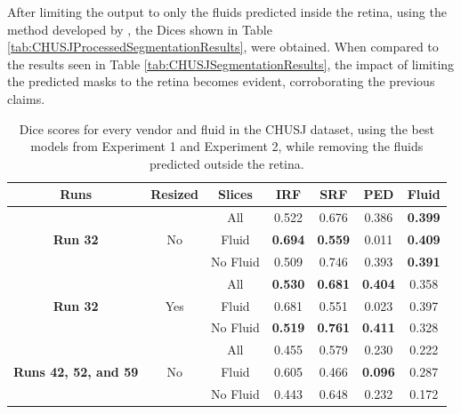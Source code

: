 After limiting the output to only the fluids predicted inside the retina, using the method developed by \textcite{Melo2023}, the Dices shown in Table \ref{tab:CHUSJProcessedSegmentationResults}, were obtained. When compared to the results seen in Table \ref{tab:CHUSJSegmentationResults}, the impact of limiting the predicted masks to the retina becomes evident, corroborating the previous claims.

\begin{table}[!ht]
	\caption{Dice scores for every vendor and fluid in the CHUSJ dataset, using the best models from Experiment 1 and Experiment 2, while removing the fluids predicted outside the retina.}
	\centering
	\begin{tabular}{|c|c|c|c|c|c|c|}
		\hline
		\textbf{Runs} &
		\textbf{Resized} &
		\textbf{Slices} &  
		\textbf{IRF} & 
		\textbf{SRF} & 
		\textbf{PED} & 
		\textbf{Fluid} \\
		
		\hline
		
		\multirow{3}{*}{\textbf{Run 32}} & \multirow{3}{*}{No} & All & 0.522 & 0.676 & 0.386 & \textbf{0.399} \\
		
		& & Fluid & \textbf{0.694} & \textbf{0.559} & 0.011 & \textbf{0.409} \\	
		
		& & No Fluid & 0.509 & 0.746 & 0.393 & \textbf{0.391}\\
		
		\hline
		
		\multirow{3}{*}{\textbf{Run 32}} & \multirow{3}{*}{Yes} & 
		All & \textbf{0.530} & \textbf{0.681} & \textbf{0.404} & 0.358 \\
		
		& & Fluid & 0.681 & 0.551 & 0.023 & 0.397 \\
		
		& & No Fluid & \textbf{0.519} & \textbf{0.761} & \textbf{0.411} & 0.328\\
		
		\hline
		\hline
		
		\multirow{3}{*}{\parbox{2cm}{\textbf{Runs 42, 52, and 59}}} & \multirow{3}{*}{No} & All & 0.455 & 0.579 & 0.230 & 0.222 \\
		
		& & Fluid & 0.605 & 0.466 & \textbf{0.096} & 0.287 \\
		
		& & No Fluid & 0.443 & 0.648 & 0.232 & 0.172\\
		

\end{tabular}
\end{table}
